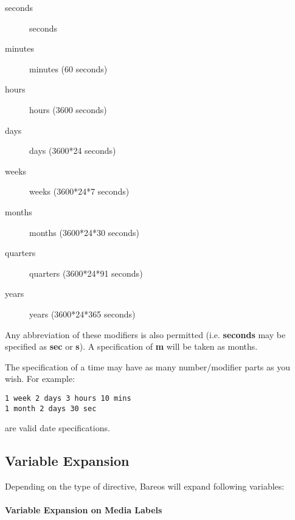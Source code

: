 \begin{description}
\begin{description}

\item [seconds]
   seconds

\item [minutes]
   minutes (60 seconds)

\item [hours]
   hours (3600 seconds)

\item [days]
   days (3600*24 seconds)

\item [weeks]
   weeks (3600*24*7 seconds)

\item [months]
   months (3600*24*30 seconds)

\item [quarters]
   quarters (3600*24*91 seconds)

\item [years]
   years (3600*24*365 seconds)
\end{description}

Any abbreviation of these modifiers is also permitted (i.e.  {\bf seconds}
may be specified as {\bf sec} or {\bf s}).  A specification of {\bf m} will
be taken as months.

The specification of a time may have as many number/modifier parts as you
wish.  For example:

\footnotesize
\begin{verbatim}
1 week 2 days 3 hours 10 mins
1 month 2 days 30 sec

\end{verbatim}
\normalsize

are valid date specifications.

\end{description}

\subsection{Variable Expansion}
    \label{VarsChapter}

Depending on the type of directive, Bareos will expand following variables:

\paragraph{Variable Expansion on Media Labels}

